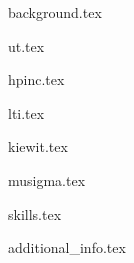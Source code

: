 \documentclass[11pt]{article}
\begin{document}
{background.tex}


{ut.tex}


{hpinc.tex}

\hfill

{lti.tex}

\hfill

{kiewit.tex}

\hfill

{musigma.tex}


{skills.tex}


{additional_info.tex}


\end{document}
